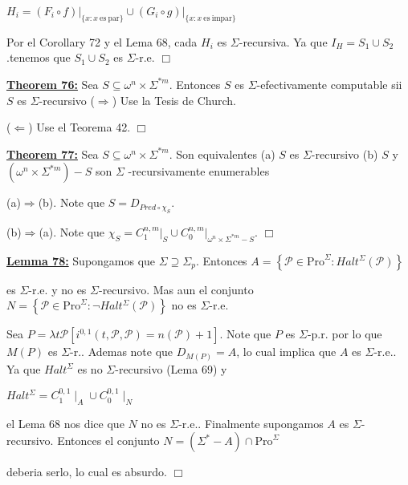 \(\displaystyle H_{i}=(F_{i}\circ f)\mathrm{\mid }_{\{x:x\mathrm{\ es\ par}\}}\cup (G_{i}\circ g)\mathrm{\mid }_{\{x:x\mathrm{\ es\ impar}\}} \)

Por el Corollary 72 y el Lema 68, cada \(H_{i}\) es \( \Sigma \)-recursiva. Ya que \(I_{H}=S_{1}\cup S_{2}\).tenemos que \(S_{1}\cup S_{2}\) es \(\Sigma \)-r.e. \(\Box\)


\textbf{\underline{Theorem 76:}} Sea \(S\subseteq \omega ^{n}\times \Sigma ^{\ast m}\). Entonces \(S\) es \(\Sigma \)-efectivamente computable sii \(S\) es \(\Sigma \)-recursivo
\PROOF (\(\Rightarrow \)) Use la Tesis de Church.

(\(\Leftarrow \)) Use el Teorema 42. \(\Box\)




\textbf{\underline{Theorem 77:}} Sea \(S\subseteq \omega ^{n}\times \Sigma ^{\ast m}.\) Son equivalentes
(a) \(S\) es \(\Sigma \)-recursivo
(b) \(S\) y \((\omega ^{n}\times \Sigma ^{\ast m})-S\) son \(\Sigma \) -recursivamente enumerables


\PROOF (a)\(\Rightarrow \)(b)\(.\) Note que \(S=D_{Pred\circ \chi _{S}}.\)

(b)\(\Rightarrow \)(a). Note que \(\chi _{S}=C_{1}^{n,m}\mathrm{\mid }_{S}\cup C_{0}^{n,m}\mathrm{\mid }_{\omega ^{n}\times \Sigma ^{\ast m}-S}\). \(\Box\)

\textbf{\underline{Lemma 78:}} Supongamos que \(\Sigma \supseteq \Sigma _{p}.\) Entonces
\(\displaystyle A=\left\{ \mathcal{P}\in \mathrm{Pro}^{\Sigma }:Halt^{\Sigma }(\mathcal{P} )\right\} \)

es \(\Sigma \)-r.e. y no es \(\Sigma \)-recursivo. Mas aun el conjunto
\(\displaystyle N=\left\{ \mathcal{P}\in \mathrm{Pro}^{\Sigma }:\lnot Halt^{\Sigma }( \mathcal{P})\right\} \)
no es \(\Sigma \)-r.e.


\PROOF Sea \(P=\lambda t\mathcal{P}\left[ i^{0,1}(t,\mathcal{P},\mathcal{P})=n( \mathcal{P})+1\right] \). Note que \(P\) es \(\Sigma \)-p.r. por lo que \(M(P)\) es \(\Sigma \)-r.. Ademas note que \(D_{M(P)}=A\), lo cual implica que \(A\) es \( \Sigma \)-r.e.. Ya que \(Halt^{\Sigma }\) es no \(\Sigma \)-recursivo (Lema 69) y

\(\displaystyle Halt^{\Sigma }=C_{1}^{0,1}\mid _{A}\cup C_{0}^{0,1}\mid _{N} \)

el Lema 68 nos dice que \(N\) no es \(\Sigma \)-r.e.. Finalmente supongamos \(A\) es \(\Sigma \)-recursivo. Entonces el conjunto
\(\displaystyle N=\left( \Sigma ^{\ast }-A\right) \cap \mathrm{Pro}^{\Sigma } \)

deberia serlo, lo cual es absurdo. \(\Box\)
